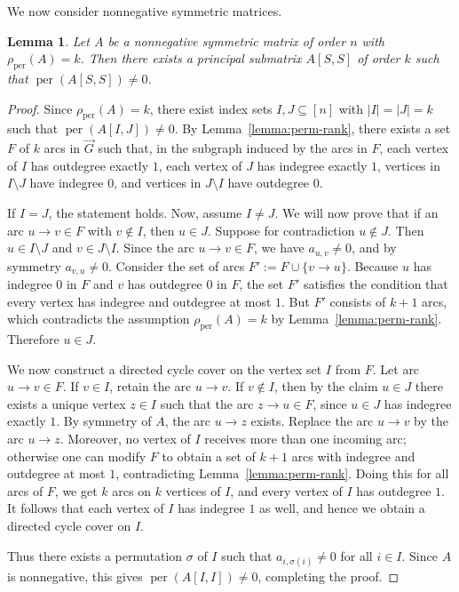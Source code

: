 \documentclass[11pt]{article}
\DeclareMathOperator{\per}{per}
\theoremstyle{plain}
\newtheorem{lemma}[theorem]{Lemma}
\theoremstyle{definition}
\theoremstyle{remark}
\begin{document}
We now consider nonnegative symmetric matrices.

\begin{lemma}\label{lemma:principal-existence}
Let \(A\) be a nonnegative symmetric matrix of order \(n\) with
\(\rho_{\operatorname{per}}(A)=k\). Then there exists a principal submatrix
\(A[S,S]\) of order \(k\) such that \(\per(A[S,S])\neq 0\).
\end{lemma}

\begin{proof}
Since \(\rho_{\per}(A)=k\), there exist index sets \(I,J\subseteq[n]\) with
\(|I|=|J|=k\) such that \(\per(A[I,J])\neq 0\).
By Lemma~\ref{lemma:perm-rank}, there exists a set \(F\) of \(k\) arcs in \(\vec G\)
such that, in the subgraph induced by the arcs in \(F\), each vertex of \(I\) has outdegree
exactly \(1\), each vertex of \(J\) has indegree exactly \(1\), vertices in
\(I\setminus J\) have indegree \(0\), and vertices in \(J\setminus I\) have
outdegree \(0\).

If $I=J$, the statement holds. Now, assume $I\neq J$. We will now prove that if an arc \(u\to v\in F\) with \(v\notin I\), then $u \in J$. Suppose for contradiction \(u\notin J\). Then \(u\in I\setminus J\) and \(v\in J\setminus I\).
Since the arc \(u\to v\in F\), we have \(a_{u,v}\neq 0\), and by symmetry
\(a_{v,u}\neq 0\). Consider the set of arcs
\(
F' := F \cup \{v\to u\}.
\)
Because \(u\) has indegree \(0\) in \(F\) and \(v\) has outdegree \(0\) in \(F\),
the set \(F'\) satisfies the condition that every vertex has indegree and
outdegree at most \(1\). But \(F'\) consists of \(k+1\) arcs, which contradicts
the assumption \(\rho_{\per}(A)=k\) by Lemma~\ref{lemma:perm-rank}. Therefore
\(u\in J\).


We now construct a directed cycle cover on the vertex set \(I\) from \(F\).
Let arc \(u\to v\in F\). If \(v\in I\), retain the arc \(u\to v\). If \(v\notin I\), then by the claim \(u\in J\) there exists a unique vertex
\(z\in I\) such that the arc \(z\to u\in F\), since \(u\in J\) has indegree exactly \(1\). By symmetry of \(A\), the arc \(u\to z\) exists.
Replace the arc \(u\to v\) by the arc \(u\to z\).
Moreover, no vertex of \(I\) receives more than one incoming arc; otherwise one can modify \(F\) to obtain a set of \(k+1\) arcs with indegree and outdegree at most \(1\), contradicting Lemma~\ref{lemma:perm-rank}. Doing this for all arcs of \(F\), we get \(k\) arcs on \(k\) vertices
of \(I\), and every vertex of \(I\) has outdegree \(1\).
It follows that each vertex of \(I\) has indegree \(1\) as well, and hence we
obtain a directed cycle cover on \(I\).

Thus there exists a permutation \(\sigma\) of \(I\) such that \(a_{i,\sigma(i)}\neq 0\) for all \(i\in I\).
Since \(A\) is nonnegative, this gives \(\per(A[I,I])\neq 0\), completing the proof.
\end{proof}
\end{document}
